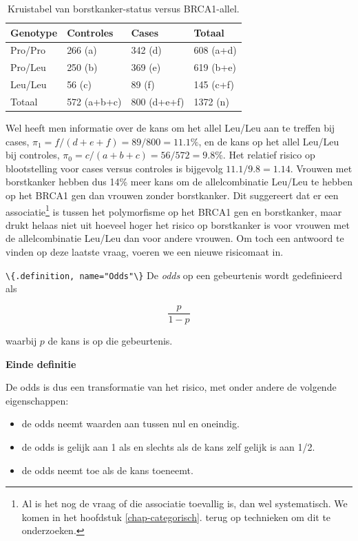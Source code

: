 \documentclass[
  12pt,dutch,coursenotes]{book}
\newcommand{\passthrough}[1]{#1}
\begin{document}
\begin{table}

\caption{\label{tab:leu2}Kruistabel van borstkanker-status versus BRCA1-allel.}
\centering
\begin{tabular}[t]{llll}
\toprule
Genotype & Controles & Cases & Totaal\\
\midrule
Pro/Pro & 266 (a) & 342 (d) & 608 (a+d)\\
Pro/Leu & 250 (b) & 369 (e) & 619 (b+e)\\
Leu/Leu & 56 (c) & 89 (f) & 145 (c+f)\\
Totaal & 572 (a+b+c) & 800 (d+e+f) & 1372 (n)\\
\bottomrule
\end{tabular}
\end{table}

Wel heeft men informatie over de kans om het allel Leu/Leu aan te treffen bij cases, \(\pi_1=f/(d+e+f)=89/800=11.1\%\), en de kans op het allel Leu/Leu bij controles, \(\pi_0=c/(a+b+c)=56/572=9.8\%\). Het relatief risico op blootstelling voor cases versus
controles is bijgevolg \(11.1/9.8=1.14\). Vrouwen met borstkanker hebben dus
14\% meer kans om de allelcombinatie Leu/Leu te hebben op het BRCA1 gen dan vrouwen zonder borstkanker.
Dit suggereert dat er
een associatie\footnote{Al is het nog de vraag of die associatie toevallig is, dan wel systematisch. We komen in het hoofdstuk \ref{chap-categorisch}. terug op technieken om dit te onderzoeken.} is tussen het polymorfisme op het BRCA1 gen en borstkanker, maar drukt helaas niet uit hoeveel hoger het risico op borstkanker is voor vrouwen met de allelcombinatie Leu/Leu dan voor andere vrouwen. Om toch een antwoord te vinden op deze laatste vraag, voeren we een nieuwe risicomaat in.

\passthrough{\lstinline!\{.definition, name="Odds"\}!}
De \emph{odds} op een gebeurtenis wordt gedefinieerd als

\begin{equation*}
\frac{p}{1-p}
\end{equation*}

waarbij \(p\) de kans is op die gebeurtenis.

\textbf{Einde definitie}

De odds is dus een transformatie van het risico, met onder andere de
volgende eigenschappen:

\begin{itemize}
\item
  de odds neemt waarden aan tussen nul en oneindig.
\item
  de odds is gelijk aan 1 als en slechts als de kans zelf gelijk is aan
  1/2.
\item
  de odds neemt toe als de kans toeneemt.
\end{itemize}
\end{document}
